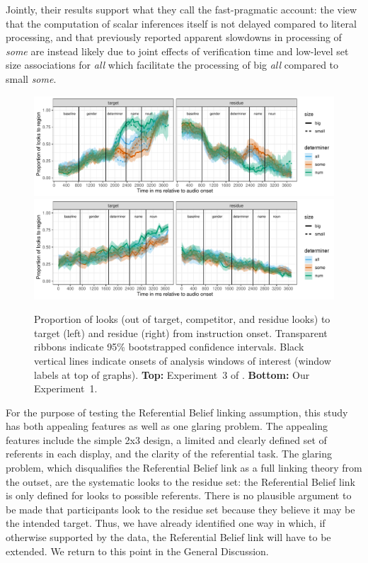 \documentclass[10pt,letterpaper]{article}
\newcommand{\expref}[1]{Experiment~#1}
\begin{document}
Jointly, their results support what they call the fast-pragmatic account: the view that the computation of scalar inferences itself is not delayed compared to literal processing, and that previously reported apparent slowdowns in processing of \emph{some} are instead likely due to joint effects of verification time and low-level set size associations for \emph{all} which facilitate the processing of big \emph{all} compared to small \emph{some}. 


\begin{figure}
\centering
\includegraphics[width=\textwidth]{../../analysis/SunBreheny/1_incremental/main/graphs/proportions_condsize_withresidue_tr.pdf}
\includegraphics[width=\textwidth]{../../analysis/SunBreheny/2_webgazer/main/graphs/proportions_condsize_withresidue_tr.pdf}
\caption{Proportion of looks (out of target, competitor, and residue looks) to target (left) and residue (right) from instruction onset. Transparent ribbons indicate 95\% bootstrapped confidence intervals. Black vertical lines indicate onsets of analysis windows of interest (window labels at top of graphs). \textbf{Top:} \expref{3} of . \textbf{Bottom:} Our \expref{1}.}
\label{fig:results-original}
\end{figure}

For the purpose of testing the Referential Belief linking assumption, this study has both appealing features as well as one glaring problem. The appealing features include the simple 2x3 design, a limited and clearly defined set of referents in each display, and the clarity of the referential task. The glaring problem, which disqualifies the Referential Belief link as a full linking theory from the outset, are the systematic looks to the residue set: the Referential Belief link is only defined for looks to possible referents. There is no plausible argument to be made that participants look to the residue set because they believe it may be the intended target.  Thus, we have already identified one way in which, if otherwise supported by the data, the Referential Belief link will have to be extended. We return to this point in the General Discussion.
\end{document}
